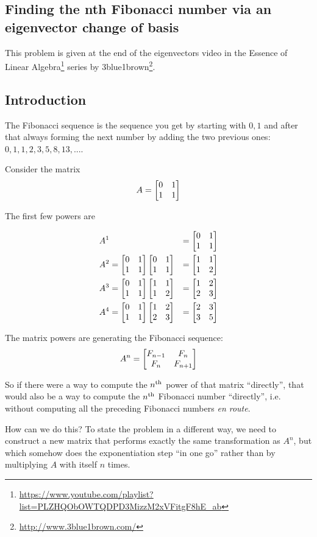 \begin{lemma}
\section{Finding the nth Fibonacci number via an eigenvector change of basis}


This problem is given at the end of the eigenvectors video in the Essence of Linear
Algebra\footnote{\url{https://www.youtube.com/playlist?list=PLZHQObOWTQDPD3MizzM2xVFitgF8hE_ab}} series by 3blue1brown\footnote{\url{http://www.3blue1brown.com/}}.


\subsection*{Introduction}

The Fibonacci sequence is the sequence you get by starting with $0, 1$ and after that always
forming the next number by adding the two previous ones: $0, 1, 1, 2, 3, 5, 8, 13, ...$.

Consider the matrix
\[
A = \begin{bmatrix}0 & 1\\1 & 1\\ \end{bmatrix}
\]

The first few powers are

\begin{align*}
&A^{1} &= \begin{bmatrix}0 & 1\\1 & 1\\ \end{bmatrix}
\\
&A^{2} = \begin{bmatrix}0 & 1\\1 & 1\\ \end{bmatrix} \begin{bmatrix}0 & 1\\1 & 1\\ \end{bmatrix} &= \begin{bmatrix}1 & 1\\1 & 2\\ \end{bmatrix}
\\
&A^{3} = \begin{bmatrix}0 & 1\\1 & 1\\ \end{bmatrix} \begin{bmatrix}1 & 1\\1 & 2\\ \end{bmatrix} &= \begin{bmatrix}1 & 2\\2 & 3\\ \end{bmatrix}
\\
&A^{4} = \begin{bmatrix}0 & 1\\1 & 1\\ \end{bmatrix} \begin{bmatrix}1 & 2\\2 & 3\\ \end{bmatrix} &= \begin{bmatrix}2 & 3\\3 & 5\\ \end{bmatrix}
\end{align*}

The matrix powers are generating the Fibonacci sequence:
\begin{align*}
  A^{n} = \begin{bmatrix}F_{n-1}  & F_n      \\F_n      & F_{n+1} \\ \end{bmatrix}
\end{align*}


So if there were a way to compute the $n^{\text{th}}$ power of that matrix ``directly'',
that would also be a way to compute the $n^{\text{th}}$ Fibonacci number ``directly'',
i.e. without computing all the preceding Fibonacci numbers \textit{en route}.

How can we do this? To state the problem in a different way, we need to
construct a new matrix that performs exactly the same transformation as $A^n$,
but which somehow does the exponentiation step ``in one go'' rather than by
multiplying $A$ with itself $n$ times.


\end{lemma}
